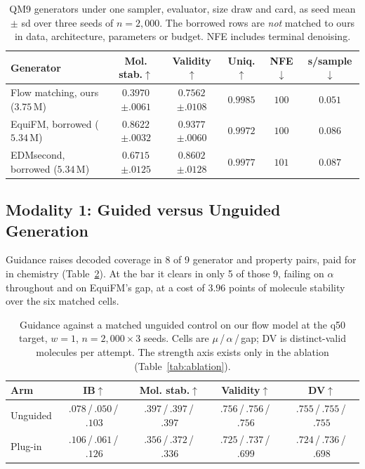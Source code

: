 \documentclass{article}
\begin{document}
\begin{table}[!htbp]
\centering\small
\caption{QM9 generators under one sampler, evaluator, size draw and card, as seed mean $\pm$ sd over three seeds of $n{=}2{,}000$. The borrowed rows are \emph{not} matched to ours in data, architecture, parameters or budget. NFE includes terminal denoising.}
\label{tab:fmvd}
\begin{tabular}{lccccc}
\toprule
Generator & Mol. stab.$\uparrow$ & Validity$\uparrow$ & Uniq.$\uparrow$ & NFE$\downarrow$ & s/sample$\downarrow$\\
\midrule
Flow matching, ours ($3.75$\,M) & $0.3970${\tiny$\pm.0061$} & $0.7562${\tiny$\pm.0108$} & $0.9985$ & $100$ & $0.051$\\
\midrule
EquiFM, borrowed ($5.34$\,M) & $0.8622${\tiny$\pm.0032$} & $0.9377${\tiny$\pm.0060$} & $0.9972$ & $100$ & $0.086$\\
EDMsecond, borrowed ($5.34$\,M) & $0.6715${\tiny$\pm.0125$} & $0.8602${\tiny$\pm.0128$} & $0.9977$ & $101$ & $0.087$\\
\bottomrule
\end{tabular}
\end{table}


\subsection{Modality 1: Guided versus Unguided Generation}\label{sec:guidworks}
Guidance raises decoded coverage in 8 of 9 generator and property pairs, paid for in chemistry (Table~\ref{tab:guidance}). At the bar it clears in only 5 of those 9, failing on $\alpha$ throughout and on EquiFM's gap, at a cost of $3.96$ points of molecule stability over the six matched cells.

\begin{table}[!htbp]
\centering\small
\caption{Guidance against a matched unguided control on our flow model at the q50 target, $w{=}1$, $n{=}2{,}000\times3$ seeds. Cells are $\mu$\,/\,$\alpha$\,/\,gap; DV is distinct-valid molecules per attempt. The strength axis exists only in the ablation (Table~\ref{tab:ablation}).}
\label{tab:guidance}
\begin{tabular}{lcccc}
\toprule
Arm & IB$\uparrow$ & Mol. stab.$\uparrow$ & Validity$\uparrow$ & DV$\uparrow$\\
\midrule
Unguided & $.078$\,/\,$.050$\,/\,$.103$ & $.397$\,/\,$.397$\,/\,$.397$ & $.756$\,/\,$.756$\,/\,$.756$ & $.755$\,/\,$.755$\,/\,$.755$\\
Plug-in & $.106$\,/\,$.061$\,/\,$.126$ & $.356$\,/\,$.372$\,/\,$.336$ & $.725$\,/\,$.737$\,/\,$.699$ & $.724$\,/\,$.736$\,/\,$.698$\\
\bottomrule
\end{tabular}
\end{table}
\end{document}

